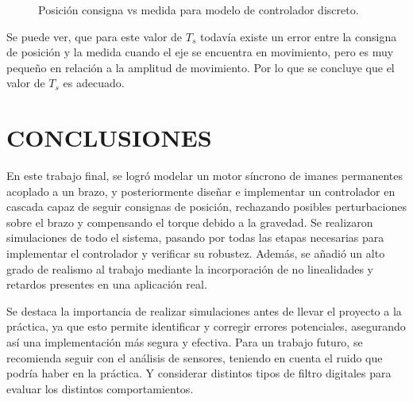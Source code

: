 \documentclass[a4paper, 10pt, onecolumn,journal]{ieeeconf}
\begin{document}
\begin{figure}[H]
	\centering
	\begin{adjustbox}{scale=0.6,max width=\columnwidth}
	\end{adjustbox}
	\caption{Posición consigna vs medida para modelo de controlador discreto.}
	\label{Posición consigna vs medida para modelo de controlador discreto}
\end{figure}
Se puede ver, que para este valor de $T_s$ todavía existe un error entre la consigna de posición y la medida cuando el eje se encuentra en movimiento, pero es muy pequeño en relación a la amplitud de movimiento. Por lo que se concluye que el valor de $T_s$ es adecuado. 
\section{CONCLUSIONES}
En este trabajo final, se logró modelar un motor síncrono de imanes permanentes acoplado a un brazo, y posteriormente diseñar e implementar un controlador en cascada capaz de seguir consignas de posición, rechazando posibles perturbaciones sobre el brazo y compensando el torque debido a la gravedad. Se realizaron simulaciones de todo el sistema, pasando por todas las etapas necesarias para implementar el controlador y verificar su robustez. Además, se añadió un alto grado de realismo al trabajo mediante la incorporación de no linealidades y retardos presentes en una aplicación real.

Se destaca la importancia de realizar simulaciones antes de llevar el proyecto a la práctica, ya que esto permite identificar y corregir errores potenciales, asegurando así una implementación más segura y efectiva.
Para un trabajo futuro, se recomienda seguir con el análisis de sensores, teniendo en cuenta el ruido que podría haber en la práctica. Y considerar distintos tipos de filtro digitales para evaluar los distintos comportamientos.
\end{document}
